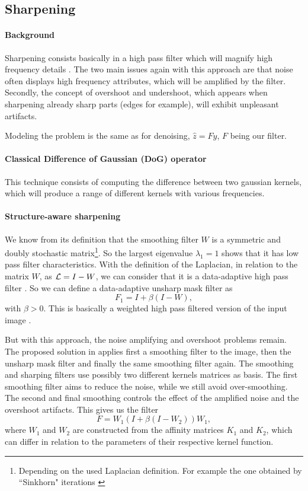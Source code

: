 \subsection{Sharpening}

\paragraph{Background}

Sharpening consists basically in a high pass filter which will magnify high frequency details \cite{kheradmand_graph-based_2016}.
The two main issues again with this approach are that noise often displays high frequency attributes, which will be amplified by the filter.
Secondly, the concept of overshoot and undershoot, which appears when sharpening already sharp parts (edges for example), will exhibit unpleasant artifacts.

Modeling the problem is the same as for denoising, \(\hat{z} = Fy\), \(F\) being our filter.

\paragraph{Classical Difference of Gaussian (DoG) operator}

This technique consists of computing the difference between two gaussian kernels, which will produce a range of different kernels with various frequencies.

\paragraph{Structure-aware sharpening}

We know from its definition \cite{kheradmand_non-linear_2015} that the smoothing filter \(W\) is a symmetric and doubly stochastic matrix\footnote{Depending on the used Laplacian definition. For example the one obtained by ``Sinkhorn" iterations \cite{milanfar_symmetrizing_2013}}.
So the largest eigenvalue \(\lambda_1 = 1\) shows that it has low pass filter characteristics.
With the definition of the Laplacian, in relation to the matrix \(W\), as \(\operatorname{\mathcal{L}} = I - W\), we can consider that it is a data-adaptive high pass filter \cite{kheradmand_graph-based_2016}.
So we can define a data-adaptive unsharp mask filter as
\[F_1 = I + \beta (I-W),\]
with \(\beta > 0\). This is basically a weighted high pass filtered version of the input image \cite{siam_slides_2016}.

But with this approach, the noise amplifying and overshoot problems remain.
The proposed solution in \cite{kheradmand_non-linear_2015} applies first a smoothing filter to the image, then the unsharp mask filter and finally the same smoothing filter again.
The smoothing and sharping filters use possibly two different kernels matrices as basis.
The first smoothing filter aims to reduce the noise, while we still avoid over-smoothing.
The second and final smoothing controls the effect of the amplified noise and the overshoot artifacts.
This gives us the filter
\[F = W_1(I + \beta (I - W_2))W_1,\]
where \(W_1\) and \(W_2\) are constructed from the affinity matrices \(K_1\) and \(K_2\), which can differ in relation to the parameters of their respective kernel function.
